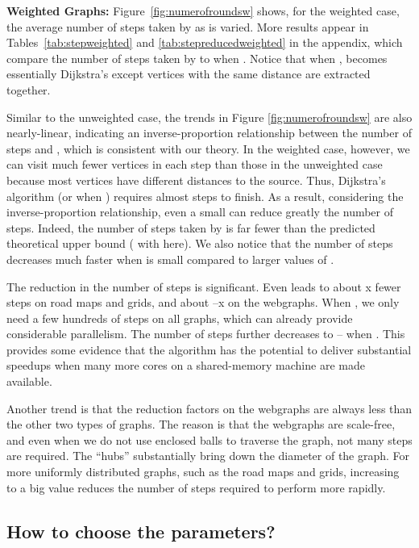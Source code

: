 \medskip

\noindent\textbf{Weighted Graphs:}
Figure~\ref{fig:numerofroundsw} shows, for the weighted case, the average number
of steps taken by \AlgName{} as  is varied.  More results appear in
Tables~\ref{tab:stepweighted} and \ref{tab:stepreducedweighted} in the appendix,
which compare the number of steps taken by \AlgName to when .  Notice
that when , \AlgName{} becomes essentially Dijkstra's except vertices with the same distance are extracted together.



Similar to the unweighted case, the trends in Figure \ref{fig:numerofroundsw}
are also nearly-linear, indicating an inverse-proportion relationship between
the number of steps and , which is consistent with our theory.  In the
weighted case, however, we can visit much fewer vertices in each step than those
in the unweighted case because most vertices have different distances to the
source.  Thus, Dijkstra's algorithm (or when ) requires almost 
steps to finish.  As a result, considering the inverse-proportion relationship,
even a small  can reduce greatly the number
of steps.  Indeed, the number of steps taken by \AlgName is far fewer than the
predicted theoretical upper bound ( with 
here).  We also notice that the number of steps decreases much faster when
 is small compared to larger values of .



The reduction in the number of steps is significant. Even  leads to
about x fewer steps on road maps and grids, and about --x on the
webgraphs. When , we only need a few hundreds of steps on all graphs, which
can already provide considerable parallelism.  The number of steps further
decreases to -- when .  This provides some evidence that the
algorithm has the potential to deliver substantial speedups when many more cores
on a shared-memory machine are made available.

Another trend is that the reduction factors on the webgraphs are always less
than the other two types of graphs.  The reason is that the webgraphs are
scale-free, and even when we do not use enclosed balls to traverse the graph,
not many steps are required. The ``hubs'' substantially bring down the diameter
of the graph.  For more uniformly distributed graphs, such as the road maps and
grids, increasing  to a big value reduces the number of steps required to
perform \sssp{} more rapidly.


\subsection{How to choose the parameters?}


